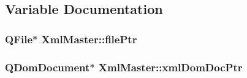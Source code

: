 \subsection{Variable Documentation}
\hypertarget{namespace_xml_master_aa7617b976593ed1594f194b72a6fbbee}{
\subsubsection[{file\-Ptr}]{\setlength{\rightskip}{0pt plus 5cm}Q\-File$\ast$ Xml\-Master\-::file\-Ptr}}\label{namespace_xml_master_aa7617b976593ed1594f194b72a6fbbee}
\hypertarget{namespace_xml_master_a79f559aff373f8cc4bb2caf7b26f13ad}{
\subsubsection[{xml\-Dom\-Doc\-Ptr}]{\setlength{\rightskip}{0pt plus 5cm}Q\-Dom\-Document$\ast$ Xml\-Master\-::xml\-Dom\-Doc\-Ptr}}\label{namespace_xml_master_a79f559aff373f8cc4bb2caf7b26f13ad}
